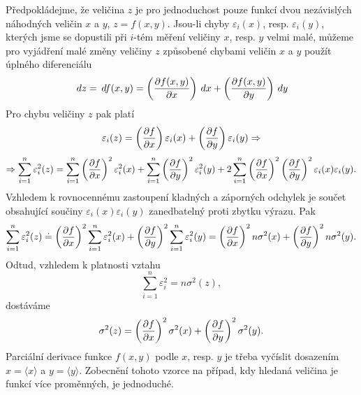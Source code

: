       Předpokládejme, že veličina \(z\) je pro jednoduchost pouze funkcí dvou nezávislých náhodných
      veličin \(x\) a \(y\), \(z = f(x,y)\). Jsou-li chyby \(\varepsilon_i(x)\), resp. 
      \(\varepsilon_i(y)\), kterých jsme se dopustili při \(i\)-tém měření veličiny \(x\), resp. 
      \(y\) velmi malé, můžeme pro vyjádření malé změny veličiny \(z\) způsobené chybami veličin 
      \(x\) a \(y\) použít úplného diferenciálu
      \begin{equation*}
        \hspace{2pt}dz = \hspace{2pt}df(x,y) = \left(\dfrac{\partial f(x,y)}{\partial x}\right)\hspace{2pt}dx + 
                               \left(\dfrac{\partial f(x,y)}{\partial y}\right)\hspace{2pt}dy
      \end{equation*}
      Pro chybu veličiny \(z\) pak platí
      \begin{equation*}
        \varepsilon_i(z) = \left(\dfrac{\partial f}{\partial x}\right)\varepsilon_i(x) + 
                           \left(\dfrac{\partial f}{\partial y}\right)\varepsilon_i(y) \Rightarrow
      \end{equation*}
      \begin{equation*}
        \Rightarrow \sum_{i=1}^{n}\varepsilon_i^2(z) 
        =  \sum_{i=1}^{n}\left(\dfrac{\partial f}{\partial x}\right)^2\varepsilon_i^2(x) 
        +  \sum_{i=1}^{n}\left(\dfrac{\partial f}{\partial y}\right)^2\varepsilon_i^2(y)
        + 2\sum_{i=1}^{n}\left(\dfrac{\partial f}{\partial x}\right)^2\left(\dfrac{\partial f}{\partial y}\right)^2\varepsilon_i(x)
          \varepsilon_i(y).
      \end{equation*}
      Vzhledem k rovnocennému zastoupení kladných a záporných odchylek je součet obsahující
      součiny \(\varepsilon_i(x)\varepsilon_i(y)\) zanedbatelný proti zbytku výrazu. Pak
      \begin{equation*}
        \sum_{i=1}^{n}\varepsilon_i^2(z) \doteq \left(\dfrac{\partial f}{\partial x}\right)^2
        \sum_{i=1}^{n}\varepsilon_i^2(x) + 
                      \left(\dfrac{\partial f}{\partial y}\right)^2\sum_{i=1}^{n}\varepsilon_i^2(y) 
        = \left(\dfrac{\partial f}{\partial x}\right)^2 n\sigma^2(x) + \left(\dfrac{\partial f}{\partial y}\right)^2n\sigma^2(y).
      \end{equation*}
      Odtud, vzhledem k platnosti vztahu
      \begin{equation*}
        \sum_{i=1}^{n}\varepsilon_i^2 = n\sigma^2(z),
      \end{equation*}
      dostáváme
      \begin{equation}\label{mai:eq075}
        \sigma^2(z) = \left(\dfrac{\partial f}{\partial x}\right)^2\sigma^2(x)
                    + \left(\dfrac{\partial f}{\partial y}\right)^2\sigma^2(y).
      \end{equation}
      Parciální derivace funkce \(f(x, y)\) podle \(x\), resp. \(y\) je třeba vyčíslit dosazením 
      \(x = \langle x\rangle\) a \(y = \langle y \rangle\). Zobecnění tohoto vzorce na případ, kdy 
      hledaná veličina je funkcí více proměnných, je jednoduché.
      
